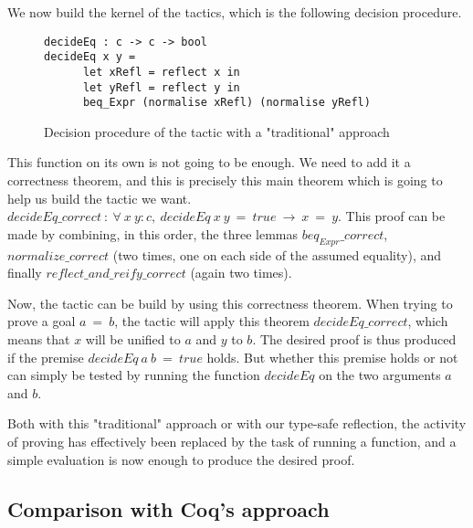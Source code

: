 We now build the kernel of the tactics, which is the following decision procedure. 
\begin{figure}[H]
\figrule
\begin{center}
\begin{verbatim}
decideEq : c -> c -> bool 
decideEq x y =
      let xRefl = reflect x in 
      let yRefl = reflect y in
      beq_Expr (normalise xRefl) (normalise yRefl)
\end{verbatim}
\end{center}
\caption{Decision procedure of the tactic with a "traditional" approach}
\figrule
\end{figure}
This function on its own is not going to be enough. We need to add it a correctness theorem, and this is precisely this main theorem which is going to help us build the tactic we want.	
$decideEq\_correct\ :\ \forall\  x\ y:c,\ decideEq\ x\ y\ =\ true\ \rightarrow\ x\ =\ y$. This proof can be made by combining, in this order, the three lemmas $beq_{Expr}\_correct$, $normalize\_correct$ (two times, one on each side of the assumed equality), and finally $reflect\_and\_reify\_correct$ (again two times).

Now, the tactic can be build by using this correctness theorem. When trying to prove a goal $a\ =\ b$, the tactic will apply this theorem $decideEq\_correct$, which means that $x$ will be unified to $a$ and $y$ to $b$. The desired proof is thus produced if the premise $decideEq\ a\ b\ =\ true$ holds. But whether this premise holds or not can simply be tested by running the function $decideEq$ on the two arguments $a$ and $b$. 

Both with this "traditional" approach or with our type-safe reflection, the activity of proving has effectively been replaced by the task of running a function, and a simple evaluation is now enough to produce the desired proof.

	\subsection {Comparison with Coq's approach}
	
